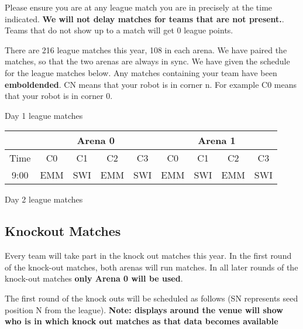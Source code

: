 \documentclass[12pt]{article}
\begin{document}
Please ensure you are at any league match you are in precisely at the time
indicated. \textbf{We will not delay matches for teams that are not present.}.
Teams that do not show up to a match will get 0 league points.


There are 216 league matches this year, 108 in each arena. We have paired the
matches, so that the two arenas are always in sync. We have given the schedule
for the league matches below. Any matches containing your team have been
\textbf{emboldended}. CN means that your robot is in corner n. For example C0
means that your robot is in corner 0.


\begin{center}
    Day 1 league matches
    \begin{tabular}{|c|l|l|l|l|l|l|l|l|}
        \hline
        \multicolumn{1}{|c|}{} & \multicolumn{4}{|c|}{Arena 0} & \multicolumn{4}{|c|}{Arena 1} \\ \hline
        Time &
 \multicolumn{1}{|c|}{C0}  &
 \multicolumn{1}{|c|}{C1}  &
 \multicolumn{1}{|c|}{C2}  &
 \multicolumn{1}{|c|}{C3}  &
 \multicolumn{1}{|c|}{C0}  &
 \multicolumn{1}{|c|}{C1}  &
 \multicolumn{1}{|c|}{C2}  &
 \multicolumn{1}{|c|}{C3} \\ \hhline{|=|=|=|=|=|=|=|=|=|}
        9:00 & EMM & SWI & EMM & SWI & EMM & SWI & EMM & SWI \\ \hline
    \end{tabular}
\end{center}

Day 2 league matches

\subsection{Knockout Matches}

Every team will take part in the knock out matches this year. In the first
round of the knock-out matches, both arenas will run matches. In all later
rounds of the knock-out matches \textbf{only Arena 0 will be used}.

The first round of the knock outs will be scheduled as follows (SN represents
seed position N from the league). \textbf{Note: displays around the venue will
show who is in which knock out matches as that data becomes available}
\end{document}
